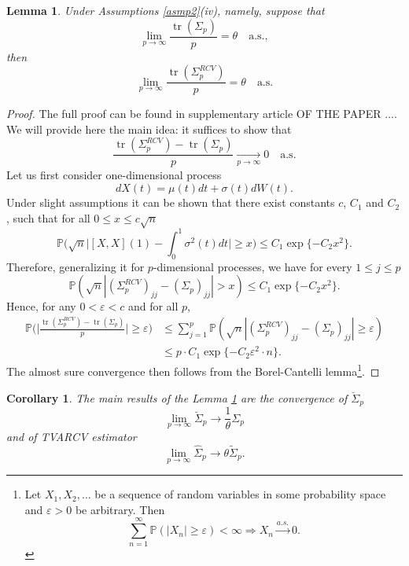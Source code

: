 \documentclass[a4paper,11pt]{article}
\theoremstyle{plain}
\newtheorem{lmm}[thm]{Lemma}
\newtheorem{crlr}[thm]{Corollary}
\theoremstyle{definition}
\newcommand{\MP}{\mathbb{P}}
\newcommand{\tr}{\operatorname{tr}}
\begin{document}
    \begin{lmm} \label{trace conv}
    	Under Assumptions \ref{asmp2}(iv), namely, suppose that
    	\[ \lim_{p \rightarrow \infty} \frac{\tr(\Sigma_p)}{p} = \theta \quad \text{a.s.}, \]
    	then
    	\[ \lim_{p \rightarrow \infty} \frac{\tr(\Sigma_p^{RCV})}{p} = \theta \quad \text{a.s.} \]
    \end{lmm}
    \begin{proof}
    	The full proof can be found in supplementary article OF THE PAPER .... We will provide here the main idea: it suffices to show that
    	\[ \frac{\tr(\Sigma_p^{RCV})-\tr(\Sigma_p)}{p} \xrightarrow[p \rightarrow \infty]{} 0 \quad \text{a.s.} \]
    	Let us first consider one-dimensional process
    	\[ dX(t) = \mu(t)dt + \sigma(t)dW(t). \]
    	Under slight assumptions it can be shown that there exist constants $c$, $C_1$ and $C_2$, such that for all $0 \leq x \leq c \sqrt{n}$
    	\[\MP\Big(\sqrt{n} \Big| [X, X](1) - \int_{0}^{1} \sigma^2(t)dt \Big| \geq x \Big) \leq C_1 \exp \{ -C_2 x^2 \}. \]
    	Therefore, generalizing it for $p$-dimensional processes, we have for every $1 \leq j \leq p$
    	\[ \MP(\sqrt{n} |(\Sigma_p^{RCV})_{jj} - (\Sigma_p)_{jj} | > x) \leq C_1 \exp \{ -C_2 x^2 \}. \]
    	Hence, for any $0 < \varepsilon < c$ and for all $p$,
    	\[ 
    	\begin{aligned}
    	\MP \Bigg(  \Bigg| \frac{\tr(\Sigma_p^{RCV})-\tr(\Sigma_p)}{p}  \Bigg| \geq \varepsilon \Bigg) & \leq \sum_{j=1}^{p} \MP(\sqrt{n} |(\Sigma_p^{RCV})_{jj} - (\Sigma_p)_{jj} | \geq \varepsilon) \\
    	& \leq p \cdot C_1 \exp \{ -C_2 \varepsilon^2 \cdot n  \}.
    	\end{aligned}
    	\]
    	The almost sure convergence then follows from the Borel-Cantelli lemma\footnote{
    		Let $X_1, X_2, \dots$ be a sequence of random variables in some probability space and $\varepsilon > 0$ be arbitrary.
    		Then
    		\[ \sum_{n=1}^{\infty} \MP(|X_n| \geq \varepsilon) < \infty \Longrightarrow X_n \xrightarrow{a.s.} 0.  \]
    	}.
    \end{proof}
    
    \begin{crlr} \label{crlr trace conv}
    	The main results of the Lemma \ref{trace conv} are the convergence of $\breve{\Sigma}_p$ 
    	\[ \lim_{p \rightarrow \infty} \breve{\Sigma}_p \rightarrow \frac{1}{\theta} \Sigma_p \]
    	and of TVARCV estimator
    	\[ \lim_{p \rightarrow \infty} \widehat{\Sigma}_p \rightarrow \theta \widetilde{\Sigma}_p. \]
    \end{crlr}
    
\end{document}

